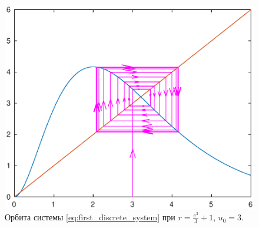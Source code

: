 \begin{figure}[h!]
        \centering
        \includegraphics[width=0.8\linewidth]{first_discrete_system/stability_of_fixed_points/re3div3plus1start3.eps}
        \caption{Орбита системы \ref{eq:first_discrete_system} при $r = \frac{e^3}{3} + 1$, $u_0 = 3$.}
\end{figure}
\clearpage